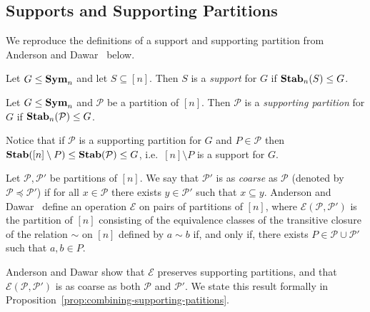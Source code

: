 \documentclass[../paper.tex]{subfiles}
\begin{document}

\subsection{Supports and Supporting Partitions}
We reproduce the definitions of a support and supporting partition from Anderson
and Dawar~\cite{AndersonD17} below.

\begin{definition}
  Let $G \leq \text{\textbf{Sym}}_n$ and let $S \subseteq [n]$. Then $S$ is a \emph{support}
  for $G$ if $\text{\textbf{Stab}}_n(S) \leq G$.
\end{definition}

\begin{definition}
  Let $G \leq \text{\textbf{Sym}}_n$ and $\mathcal{P}$ be a partition of $[n]$. Then
  $\mathcal{P}$ is a \emph{supporting partition} for $G$ if
  $\text{\textbf{Stab}}_n(\mathcal{P}) \leq G$.
\end{definition}

Notice that if $\mathcal{P}$ is a supporting partition for $G$ and $P \in
\mathcal{P}$ then $\text{\textbf{Stab}}([n] \setminus P) \leq \text{\textbf{Stab}}(\mathcal{P}) \leq G$, i.e.\
$[n] \setminus P$ is a support for $G$.

Let $\mathcal{P}, \mathcal{P}'$ be partitions of $[n]$. We say that
$\mathcal{P}'$ is as \emph{coarse} as $\mathcal{P}$ (denoted by $\mathcal{P}
\preceq \mathcal{P}'$) if for all $x \in \mathcal{P}$ there exists $y \in
\mathcal{P}'$ such that $x \subseteq y$. Anderson and Dawar~\cite{AndersonD17}
define an operation $\mathcal{E}$ on pairs of partitions of $[n]$, where
$\mathcal{E} (\mathcal{P}, \mathcal{P}')$ is the partition of $[n]$ consisting
of the equivalence classes of the transitive closure of the relation $\sim$ on
$[n]$ defined by $a \sim b$ if, and only if, there exists $P \in \mathcal{P}
\cup \mathcal{P}'$ such that $a,b \in P$.

Anderson and Dawar show that $\mathcal{E}$ preserves supporting partitions, and
that $\mathcal{E}(\mathcal{P}, \mathcal{P}')$ is as coarse as both $\mathcal{P}$
and $\mathcal{P}'$. We state this result formally in
Proposition~\ref{prop:combining-supporting-patitions}.
\end{document}
